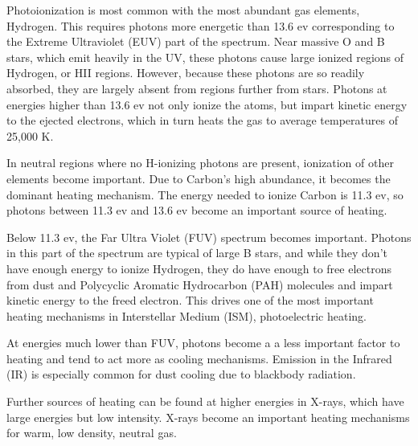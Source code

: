 Photoionization is most common with the most abundant gas elements, Hydrogen. This requires photons more energetic than 13.6 ev corresponding to the Extreme Ultraviolet (EUV) part of the spectrum. Near massive O and B stars, which emit heavily in the UV, these photons cause large ionized regions of Hydrogen, or HII regions. However, because these photons are so readily absorbed, they are largely absent from regions further from stars. Photons at energies higher than 13.6 ev not only ionize the atoms, but impart kinetic energy to the ejected electrons, which in turn heats the gas to average temperatures of 25,000 K.

In neutral regions where no H-ionizing photons are present, ionization of other elements become important. Due to Carbon's high abundance, it becomes the dominant heating mechanism. The energy needed to ionize Carbon is 11.3 ev, so photons between 11.3 ev and 13.6 ev become an important source of heating. 

Below 11.3 ev, the Far Ultra Violet (FUV) spectrum becomes important. Photons in this part of the spectrum are typical of large B stars, and while they don't have enough energy to ionize Hydrogen, they do have enough to free electrons from dust and Polycyclic Aromatic Hydrocarbon (PAH) molecules and impart kinetic energy to the freed electron. This drives one of the most important heating mechanisms in Interstellar Medium (ISM), photoelectric heating.

At energies much lower than FUV, photons become a a less important factor to heating and tend to act more as cooling mechanisms. Emission in the Infrared (IR) is especially common for dust cooling due to blackbody radiation.

Further sources of heating can be found at higher energies in X-rays, which have large energies but low intensity. X-rays become an important heating mechanisms for warm, low density, neutral gas.


